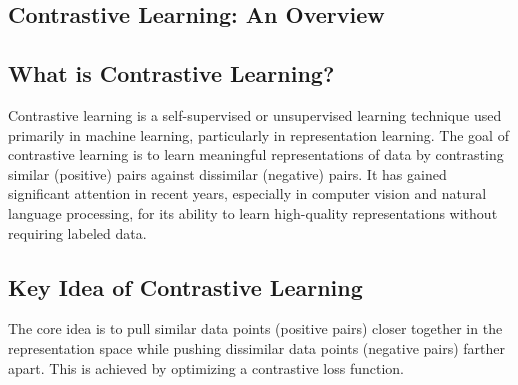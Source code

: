 \begin{notechapter}
\chapter{Contrastive Learning: An Overview}\label{ch:contrastive-overview}

\section{What is Contrastive Learning?}
Contrastive learning is a self-supervised or unsupervised learning 
technique used primarily in machine learning, particularly in 
representation learning. The goal of contrastive learning is to learn 
meaningful representations of data by contrasting similar (positive) 
pairs against dissimilar (negative) pairs. It has gained significant 
attention in recent years, especially in computer vision and natural 
language processing, for its ability to learn high-quality 
representations without requiring labeled data.

\section{Key Idea of Contrastive Learning}
The core idea is to pull similar data points (positive pairs) closer 
together in the representation space while pushing dissimilar data 
points (negative pairs) farther apart. This is achieved by optimizing a 
contrastive loss function.


\end{notechapter}
